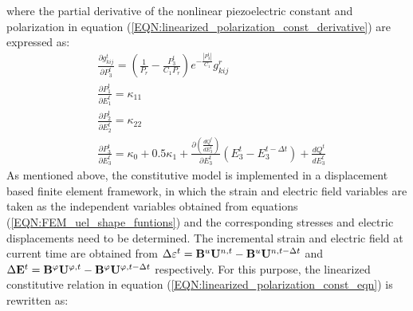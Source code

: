 where the partial derivative of the nonlinear piezoelectric constant and polarization in equation (\ref{EQN:linearized_polarization_const_derivative}) are expressed as:
\begin{equation}  
\begin{aligned} 
&\frac{{\partial g_{kij}^t}}{{\partial P_3^t}} = \left( {\frac{1}{{{P_r}}} - \frac{{P_3^t}}{{{C_1}{P_r}}}} \right){e^{ - \frac{{\left| {P_3^t} \right|}}{{{C_1}}}}}g_{kij}^r\\
&\frac{{\partial P_1^t}}{{\partial E_1^t}} = {\kappa _{11}} \\
& \frac{{\partial P_2^t}}{{\partial E_2^t}} = {\kappa _{22}}\\ 
& \frac{{\partial P_3^t}}{{\partial E_3^t}} = {\kappa _0} + 0.5{\kappa _1} + \frac{{\partial \left( {\frac{{d{Q^t}}}{{dE_3^t}}} \right)}}{{\partial E_3^t}}\left( {E_3^t - E_3^{t - \Delta t}} \right) + \frac{{d{Q^t}}}{{dE_3^t}}
\label{EQN:linearized_polarization_const_derivative_tangent}
\end{aligned} 
\end{equation} 
As mentioned above, the constitutive model is implemented in a displacement based finite element framework, in which the strain and electric field variables are taken as the independent variables obtained from equations (\ref{EQN:FEM_uel_shape_funtions}) and the corresponding stresses and electric displacements need to be determined. 
The incremental strain and electric field at current time are obtained from $\Delta {{\bf{\varepsilon }}^t} = {{\bf{B}}^u}{{\bf{U}}^{n,t}} - {{\bf{B}}^u}{{\bf{U}}^{n,t - \Delta t}}$ and $\Delta {{\bf{E}}^t} = {{\bf{B}}^\varphi }{{\bf{U}}^{\varphi ,t}} - {{\bf{B}}^\varphi }{{\bf{U}}^{\varphi ,t - \Delta t}}$ respectively. 
For this purpose, the linearized constitutive relation in equation (\ref{EQN:linearized_polarization_const_eqn}) is rewritten as: 

